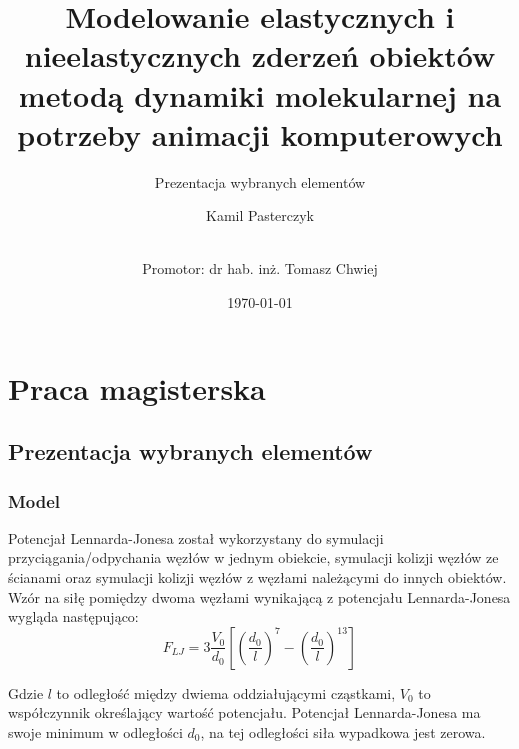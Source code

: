 \documentclass{beamer}
\title{Modelowanie elastycznych i nieelastycznych zderzeń obiektów 
metodą dynamiki molekularnej na potrzeby animacji komputerowych}
\subtitle{Prezentacja wybranych elementów}
\author[Kamil Pasterczyk]{Kamil Pasterczyk \and \\ Promotor: dr hab. inż. Tomasz Chwiej}
\institute[AGH]{AGH University of Science and Technology}
\date{\today}
\begin{document}
\section{Praca magisterska}
\subsection{Prezentacja wybranych elementów}

\begin{frame}
    \titlepage
\end{frame}

\begin{frame}
    \frametitle{Model}
    Potencjał Lennarda-Jonesa został wykorzystany do symulacji przyciągania/odpychania węzłów w jednym obiekcie,
    symulacji kolizji węzłów ze ścianami oraz symulacji kolizji węzłów z węzłami należącymi
    do innych obiektów. Wzór na siłę pomiędzy dwoma węzłami wynikającą z potencjału Lennarda-Jonesa wygląda następująco:
    \begin{equation}
        F_{LJ} = 3\frac{V_0}{d_0} \left[ \left(\frac{d_0}{l}\right)^{7} - \left(\frac{d_0}{l}\right)^{13} \right]
    \end{equation}

    Gdzie $l$ to odległość między dwiema oddziałującymi cząstkami, $V_0$ to współczynnik określający wartość potencjału.
    Potencjał Lennarda-Jonesa ma swoje minimum w odległości $d_0$, na tej odległości siła wypadkowa jest zerowa.
\end{frame}
\end{document}
